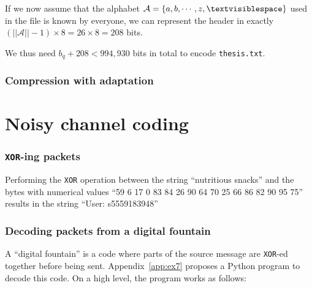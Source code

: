 \documentclass[10pt,a4paper,oneside,onecolumn]{article}
\newcommand*{\thesisTXT}{{\tt thesis.txt}\xspace}
\newcommand*{\XOR}{{\tt XOR}\xspace}
\newcommand*{\norm}[1]{\ensuremath{\left|\left|#1\right|\right|}}
\newcommand*{\lbr}{\ensuremath{\left\{}}
\newcommand*{\rbr}{\ensuremath{\right\}}}
\begin{document}
If we now assume that the alphabet $\mathcal{A} = \lbr a, b, \cdots, z,
\textvisiblespace \rbr$ used in the file is known by everyone\footnotemark, we
can represent the header in exactly $(\norm{\mathcal{A}} - 1) \times 8 = 26
\times 8 = 208$ bits.\footnotemark
{}

We thus need $b_q + 208 < 994,930$ bits in total to encode \thesisTXT.


\section{Compression with adaptation}\label{sec:ex5}


\part{Noisy channel coding}


\section{\XOR-ing packets}\label{sec:ex6}

Performing the \XOR operation between the string ``nutritious snacks'' and the
bytes with numerical values ``59 6 17 0 83 84 26 90 64 70 25 66 86 82 90 95 75''
results in the string ``User: s5559183948''


\section{Decoding packets from a digital fountain}\label{sec:ex7}

A ``digital fountain'' is a code where parts of the source message are \XOR-ed
together before being sent. Appendix~\ref{app:ex7} proposes a Python program to
decode this code. On a high level, the program works as follows:
\end{document}
